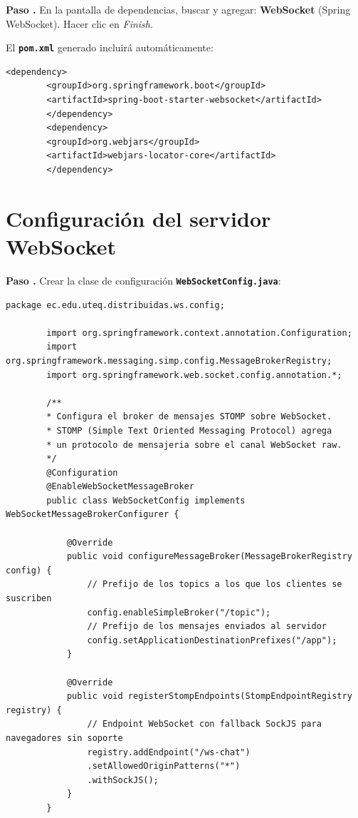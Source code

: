\documentclass[12pt, a4paper, openany]{book}
\newcounter{paso}[section]
\newcommand{\paso}[1]{%
	\stepcounter{paso}%
	\medskip\noindent
	\begin{tcolorbox}[enhanced, colback=white, colframe=practiceBlue,
		boxrule=0.8pt, arc=3pt, left=6pt, right=6pt, top=4pt, bottom=4pt,
		before upper={\noindent}]
		\textcolor{practiceBlue}{\textbf{Paso \arabic{paso}.}} #1
	\end{tcolorbox}%
}
\newcommand{\archivo}[1]{\texttt{\textbf{#1}}}
\newcommand{\menu}[1]{\textit{#1}}
\begin{document}
	\paso{En la pantalla de dependencias, buscar y agregar:
		\textbf{WebSocket} (Spring WebSocket). Hacer clic en \menu{Finish}.}
	
	El \archivo{pom.xml} generado incluirá automáticamente:
	
	\begin{lstlisting}[style=XMLStyle, caption={Dependencia WebSocket en pom.xml}]
		<dependency>
		<groupId>org.springframework.boot</groupId>
		<artifactId>spring-boot-starter-websocket</artifactId>
		</dependency>
		<dependency>
		<groupId>org.webjars</groupId>
		<artifactId>webjars-locator-core</artifactId>
		</dependency>
	\end{lstlisting}
	
	\section{Configuración del servidor WebSocket}
	
	\paso{Crear la clase de configuración \archivo{WebSocketConfig.java}:}
	
	\begin{lstlisting}[style=JavaStyle, caption={WebSocketConfig.java --- Configuración STOMP sobre WebSocket}]
		package ec.edu.uteq.distribuidas.ws.config;
		
		import org.springframework.context.annotation.Configuration;
		import org.springframework.messaging.simp.config.MessageBrokerRegistry;
		import org.springframework.web.socket.config.annotation.*;
		
		/**
		* Configura el broker de mensajes STOMP sobre WebSocket.
		* STOMP (Simple Text Oriented Messaging Protocol) agrega
		* un protocolo de mensajeria sobre el canal WebSocket raw.
		*/
		@Configuration
		@EnableWebSocketMessageBroker
		public class WebSocketConfig implements WebSocketMessageBrokerConfigurer {
			
			@Override
			public void configureMessageBroker(MessageBrokerRegistry config) {
				// Prefijo de los topics a los que los clientes se suscriben
				config.enableSimpleBroker("/topic");
				// Prefijo de los mensajes enviados al servidor
				config.setApplicationDestinationPrefixes("/app");
			}
			
			@Override
			public void registerStompEndpoints(StompEndpointRegistry registry) {
				// Endpoint WebSocket con fallback SockJS para navegadores sin soporte
				registry.addEndpoint("/ws-chat")
				.setAllowedOriginPatterns("*")
				.withSockJS();
			}
		}
	\end{lstlisting}
	
\end{document}
